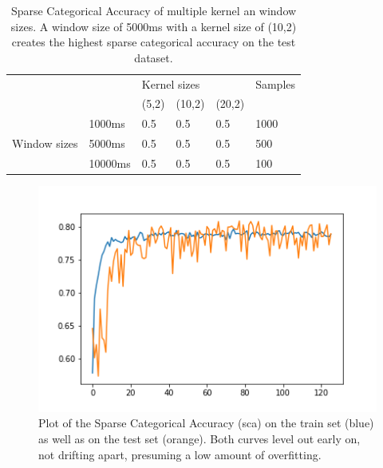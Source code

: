 \documentclass[runningheads]{llncs}
\begin{document}
\begin{table}[]
\centering
\begin{tabular}{ll|l|l|l|l|}
\cline{3-6}
                                                    &         & \multicolumn{3}{l|}{Kernel sizes} & Samples \\ \cline{3-6} 
                                                    &         & (5,2)     & (10,2)    & (20,2)    &         \\ \hline
\multicolumn{1}{|l|}{\multirow{3}{*}{Window sizes}} & 1000ms  & 0.5       & 0.5       & 0.5       & 1000    \\ \cline{2-6} 
\multicolumn{1}{|l|}{}                              & 5000ms  & 0.5       & 0.5       & 0.5       & 500     \\ \cline{2-6} 
\multicolumn{1}{|l|}{}                              & 10000ms & 0.5       & 0.5       & 0.5       & 100     \\ \hline
\end{tabular}
\caption{Sparse Categorical Accuracy of multiple kernel an window sizes. A window size of 5000ms with a kernel size of (10,2) creates the highest sparse categorical accuracy on the test dataset.}
\label{table:configurations}
\end{table}

\begin{figure}
\includegraphics[width=\textwidth]{accuracy_plot.png}
\caption{Plot of the Sparse Categorical Accuracy (sca) on the train set (blue) as well as on the test set (orange). Both curves level out early on, not drifting apart, presuming a low amount of overfitting.}
\label{fig4}	
\end{figure} 
\end{document}
